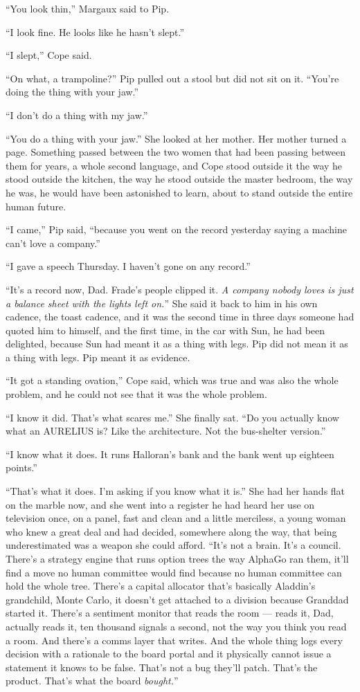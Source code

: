 \documentclass[11pt,openany]{book}
\begin{document}
``You look thin,'' Margaux said to Pip.

``I look fine. He looks like he hasn't slept.''

``I slept,'' Cope said.

``On what, a trampoline?'' Pip pulled out a stool but did not sit on it. ``You're doing the thing with your jaw.''

``I don't do a thing with my jaw.''

``You do a thing with your jaw.'' She looked at her mother. Her mother turned a page. Something passed between the two women that had been passing between them for years, a whole second language, and Cope stood outside it the way he stood outside the kitchen, the way he stood outside the master bedroom, the way he was, he would have been astonished to learn, about to stand outside the entire human future.

``I came,'' Pip said, ``because you went on the record yesterday saying a machine can't love a company.''

``I gave a speech Thursday. I haven't gone on any record.''

``It's a record now, Dad. Frade's people clipped it. \textit{A company nobody loves is just a balance sheet with the lights left on.}'' She said it back to him in his own cadence, the toast cadence, and it was the second time in three days someone had quoted him to himself, and the first time, in the car with Sun, he had been delighted, because Sun had meant it as a thing with legs. Pip did not mean it as a thing with legs. Pip meant it as evidence.

``It got a standing ovation,'' Cope said, which was true and was also the whole problem, and he could not see that it was the whole problem.

``I know it did. That's what scares me.'' She finally sat. ``Do you actually know what an AURELIUS is? Like the architecture. Not the bus-shelter version.''

``I know what it does. It runs Halloran's bank and the bank went up eighteen points.''

``That's what it does. I'm asking if you know what it is.'' She had her hands flat on the marble now, and she went into a register he had heard her use on television once, on a panel, fast and clean and a little merciless, a young woman who knew a great deal and had decided, somewhere along the way, that being underestimated was a weapon she could afford. ``It's not a brain. It's a council. There's a strategy engine that runs option trees the way AlphaGo ran them, it'll find a move no human committee would find because no human committee can hold the whole tree. There's a capital allocator that's basically Aladdin's grandchild, Monte Carlo, it doesn't get attached to a division because Granddad started it. There's a sentiment monitor that reads the room --- reads it, Dad, actually reads it, ten thousand signals a second, not the way you think you read a room. And there's a comms layer that writes. And the whole thing logs every decision with a rationale to the board portal and it physically cannot issue a statement it knows to be false. That's not a bug they'll patch. That's the product. That's what the board \textit{bought.}''
\end{document}
